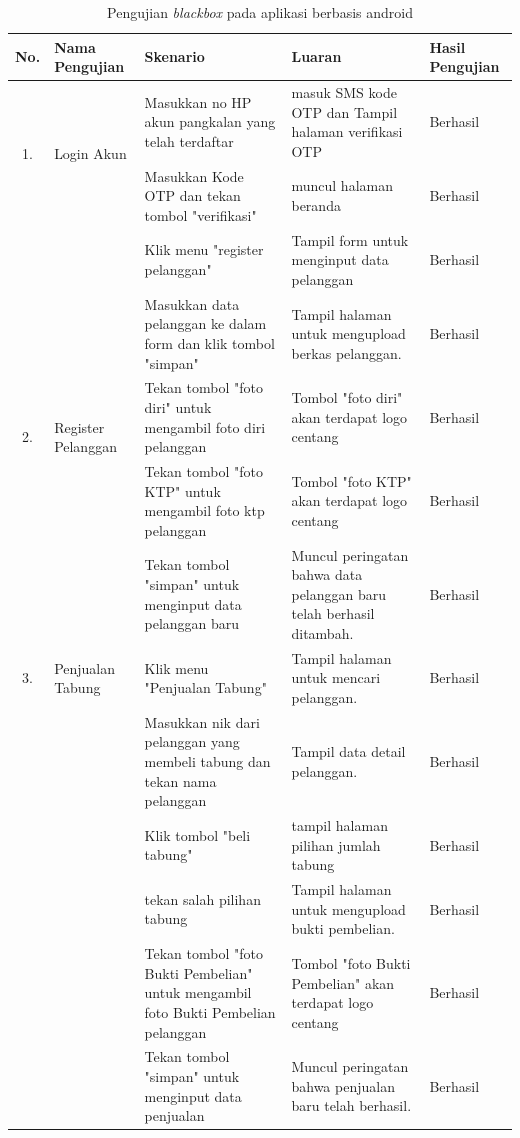 	\begin{longtable}{ |c|p{3cm}|p{3cm}|p{3cm}|p{2cm}|}
		\caption{Pengujian \textit{blackbox} pada aplikasi berbasis android}
		\label{ujiMobile} \\ \hline
		\textbf{No.}                  &  \textbf{Nama Pengujian}         & \textbf{Skenario}                                       & \textbf{Luaran}              & \textbf{Hasil Pengujian} \\ \hline
		
		
		\multirow{2}{*}{1.}  & 	\multirow{2}{*}{Login Akun} & Masukkan no HP akun pangkalan yang telah terdaftar           & masuk SMS kode OTP dan  Tampil halaman verifikasi OTP         & Berhasil \\ \cline{3-5}
		& & Masukkan Kode OTP dan tekan tombol "verifikasi"           & muncul halaman beranda         & Berhasil \\ \hline
		
		\multirow{5}{*}{2.}  & 	\multirow{5}{*}{\parbox{3cm}{\centering Register Pelanggan}} & Klik menu "register pelanggan"           & Tampil form untuk menginput data pelanggan            & Berhasil \\ \cline{3-5}
		& & Masukkan data pelanggan ke dalam form dan klik tombol "simpan"           & Tampil halaman untuk mengupload berkas pelanggan.             & Berhasil \\ \cline{3-5}
		& &  Tekan tombol "foto diri" untuk mengambil foto diri pelanggan        & Tombol "foto diri" akan terdapat logo centang             & Berhasil \\ \cline{3-5}
		& &  Tekan tombol "foto KTP" untuk mengambil foto ktp pelanggan        & Tombol "foto KTP" akan terdapat logo centang             & Berhasil \\ \hline
		& &  Tekan tombol "simpan" untuk menginput data pelanggan baru   & Muncul peringatan bahwa data pelanggan baru telah berhasil ditambah.             & Berhasil \\ \hline
		
		\multirow{1}{*}{3.}  & 	\multirow{1}{*}{Penjualan Tabung} & Klik menu "Penjualan Tabung"          & Tampil halaman untuk mencari pelanggan.             & Berhasil \\ \cline{3-5}
		\multirow{5}{*}{} & \multirow{5}{*}{} & Masukkan nik dari pelanggan yang membeli tabung dan tekan nama pelanggan           & Tampil data detail pelanggan.             & Berhasil \\ \cline{3-5}
		& & Klik tombol "beli tabung"           & tampil halaman pilihan jumlah tabung & Berhasil
		 \\ \cline{3-5}
		& & tekan salah pilihan tabung           & Tampil halaman untuk mengupload bukti pembelian.             & Berhasil \\ \cline{3-5}
		& &  Tekan tombol "foto Bukti Pembelian" untuk mengambil foto Bukti Pembelian pelanggan        & Tombol "foto Bukti Pembelian" akan terdapat logo centang             & Berhasil \\ \cline{3-5}
		& &  Tekan tombol "simpan" untuk menginput data penjualan  & Muncul peringatan bahwa penjualan baru telah berhasil.             & Berhasil \\ \hline
		

\end{longtable}
